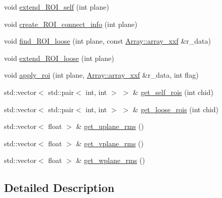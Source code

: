 \begin{DoxyCompactItemize}
\item 
void \hyperlink{class_wire_cell_1_1_sig_proc_1_1_r_o_i__formation_a3d677e7421cc9da9a878d9e5528c9b2a}{extend\+\_\+\+R\+O\+I\+\_\+self} (int plane)
\item 
void \hyperlink{class_wire_cell_1_1_sig_proc_1_1_r_o_i__formation_a9d634c399cbd39c902a0f84b25ae192f}{create\+\_\+\+R\+O\+I\+\_\+connect\+\_\+info} (int plane)
\item 
void \hyperlink{class_wire_cell_1_1_sig_proc_1_1_r_o_i__formation_af11c69caa55a69618d96892afcb46933}{find\+\_\+\+R\+O\+I\+\_\+loose} (int plane, const \hyperlink{namespace_wire_cell_1_1_array_ab565fef5e33632bb02f0ed4be803020c}{Array\+::array\+\_\+xxf} \&r\+\_\+data)
\item 
void \hyperlink{class_wire_cell_1_1_sig_proc_1_1_r_o_i__formation_aadada4e6a77ac41217a7b8858b26355f}{extend\+\_\+\+R\+O\+I\+\_\+loose} (int plane)
\item 
void \hyperlink{class_wire_cell_1_1_sig_proc_1_1_r_o_i__formation_a6469d0ca6eef5ebacc4ed85489413d24}{apply\+\_\+roi} (int plane, \hyperlink{namespace_wire_cell_1_1_array_ab565fef5e33632bb02f0ed4be803020c}{Array\+::array\+\_\+xxf} \&r\+\_\+data, int flag)
\item 
std\+::vector$<$ std\+::pair$<$ int, int $>$ $>$ \& \hyperlink{class_wire_cell_1_1_sig_proc_1_1_r_o_i__formation_aa22dcb0af16abe3380c1d6c12c2d862d}{get\+\_\+self\+\_\+rois} (int chid)
\item 
std\+::vector$<$ std\+::pair$<$ int, int $>$ $>$ \& \hyperlink{class_wire_cell_1_1_sig_proc_1_1_r_o_i__formation_a851997f497e0bdf05982e955d6d4007d}{get\+\_\+loose\+\_\+rois} (int chid)
\item 
std\+::vector$<$ float $>$ \& \hyperlink{class_wire_cell_1_1_sig_proc_1_1_r_o_i__formation_a285fb34576a925bea63de0de7051e5bc}{get\+\_\+uplane\+\_\+rms} ()
\item 
std\+::vector$<$ float $>$ \& \hyperlink{class_wire_cell_1_1_sig_proc_1_1_r_o_i__formation_acab588261e8829edd8ba9f2c7dd90780}{get\+\_\+vplane\+\_\+rms} ()
\item 
std\+::vector$<$ float $>$ \& \hyperlink{class_wire_cell_1_1_sig_proc_1_1_r_o_i__formation_afe5f0a8059b5d5b9b7e34077fea64c0a}{get\+\_\+wplane\+\_\+rms} ()
\end{DoxyCompactItemize}


\subsection{Detailed Description}


